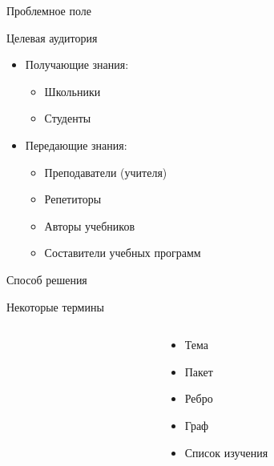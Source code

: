 \begin{frame}{Проблемное поле}
\end{frame}

\begin{frame}{Целевая аудитория}
    \begin{itemize}
        \item<+-> Получающие знания:
            \begin{itemize}
                \item Школьники
                \item Студенты
            \end{itemize}
        \item<+-> Передающие знания:
            \begin{itemize}
                \item Преподаватели (учителя)
                \item Репетиторы
                \item Авторы учебников
                \item Составители учебных программ
            \end{itemize}
    \end{itemize}
\end{frame}

\begin{frame}{Способ решения}
\end{frame}

\begin{frame}{Некоторые термины}
    \begin{columns}[c]
        \begin{column}{.45\textwidth}
        \end{column}
        \begin{column}{.45\textwidth}
            \begin{itemize}
                \item<1-> Тема
                \item<1-> Пакет
                \item<1-> Ребро
                \item<2-> Граф
                \item<3-> Список изучения
            \end{itemize}
        \end{column}
    \end{columns}
\end{frame}

